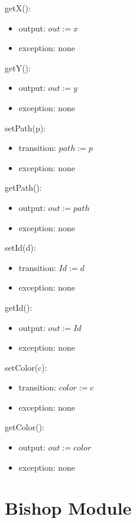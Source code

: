 \documentclass[12pt]{article}
\begin{document}
\noindent getX():
\begin{itemize}
\item output: $out := x$
\item exception: none
\end{itemize}

\noindent getY():
\begin{itemize}
\item output: $out := y$
\item exception: none
\end{itemize}

\noindent setPath(p):
\begin{itemize}
\item transition: $path := p$ 
\item exception: none
\end{itemize}

\noindent getPath():
\begin{itemize}
\item output: $out := path$
\item exception: none
\end{itemize}

\noindent setId(d):
\begin{itemize}
\item transition: $Id := d$ 
\item exception: none
\end{itemize}

\noindent getId():
\begin{itemize}
\item output: $out := Id$
\item exception: none
\end{itemize}

\noindent setColor(c):
\begin{itemize}
\item transition: $color := c$ 
\item exception: none
\end{itemize}

\noindent getColor():
\begin{itemize}
\item output: $out := color$
\item exception: none
\end{itemize}

\newpage

\section* {Bishop Module}
\end{document}
